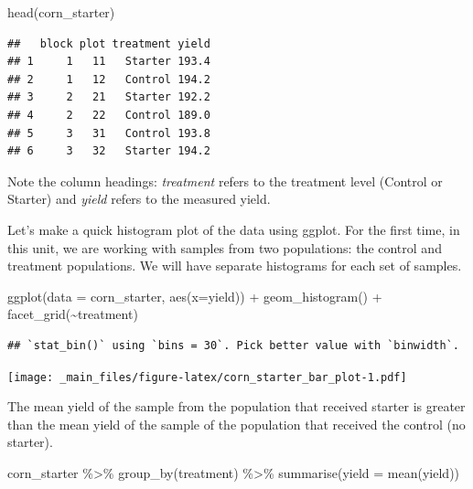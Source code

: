 \documentclass[
]{book}
\newenvironment{Shaded}{\begin{snugshade}}{\end{snugshade}}
\newcommand{\AttributeTok}[1]{\textcolor[rgb]{0.77,0.63,0.00}{#1}}
\newcommand{\FunctionTok}[1]{\textcolor[rgb]{0.00,0.00,0.00}{#1}}
\newcommand{\NormalTok}[1]{#1}
\newcommand{\SpecialCharTok}[1]{\textcolor[rgb]{0.00,0.00,0.00}{#1}}
\begin{document}
\begin{Shaded}
\begin{Highlighting}[]
\FunctionTok{head}\NormalTok{(corn\_starter)}
\end{Highlighting}
\end{Shaded}

\begin{verbatim}
##   block plot treatment yield
## 1     1   11   Starter 193.4
## 2     1   12   Control 194.2
## 3     2   21   Starter 192.2
## 4     2   22   Control 189.0
## 5     3   31   Control 193.8
## 6     3   32   Starter 194.2
\end{verbatim}

Note the column headings: \emph{treatment} refers to the treatment level
(Control or Starter) and \emph{yield} refers to the measured yield.

Let's make a quick histogram plot of the data using ggplot. For the
first time, in this unit, we are working with samples from two
populations: the control and treatment populations. We will have
separate histograms for each set of samples.

\begin{Shaded}
\begin{Highlighting}[]
\FunctionTok{ggplot}\NormalTok{(}\AttributeTok{data =}\NormalTok{ corn\_starter, }\FunctionTok{aes}\NormalTok{(}\AttributeTok{x=}\NormalTok{yield)) }\SpecialCharTok{+}
  \FunctionTok{geom\_histogram}\NormalTok{() }\SpecialCharTok{+}
  \FunctionTok{facet\_grid}\NormalTok{(}\SpecialCharTok{\textasciitilde{}}\NormalTok{treatment)}
\end{Highlighting}
\end{Shaded}

\begin{verbatim}
## `stat_bin()` using `bins = 30`. Pick better value with `binwidth`.
\end{verbatim}

\texttt{[image: \_main\_files/figure-latex/corn\_starter\_bar\_plot-1.pdf]}

The mean yield of the sample from the population that received starter
is greater than the mean yield of the sample of the population that
received the control (no starter).

\begin{Shaded}
\begin{Highlighting}[]
\NormalTok{corn\_starter }\SpecialCharTok{\%\textgreater{}\%}
  \FunctionTok{group\_by}\NormalTok{(treatment) }\SpecialCharTok{\%\textgreater{}\%}
  \FunctionTok{summarise}\NormalTok{(}\AttributeTok{yield =} \FunctionTok{mean}\NormalTok{(yield))}
\end{Highlighting}
\end{Shaded}
\end{document}
